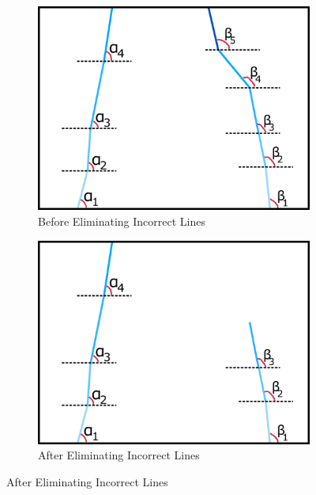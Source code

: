 \documentclass[a4paper,12pt]{article}
\begin{document}
\begin{enumerate}[A.]
\begin{figure}[t!]
\begin{subfigure}{.46\textwidth}
\includegraphics[width=0.44\unitlength]{images/dataP_explained3}

\caption{\label{fig:dataP_explained3} Before Eliminating Incorrect Lines}

\end{subfigure}%
\begin{subfigure}{.46\textwidth}

\centering

\includegraphics[width=0.44\unitlength]{images/dataP_explained4}

\caption{\label{fig:dataP_explained4} After Eliminating Incorrect Lines}

\end{subfigure}


\end{figure}
\end{enumerate}
\end{document}
